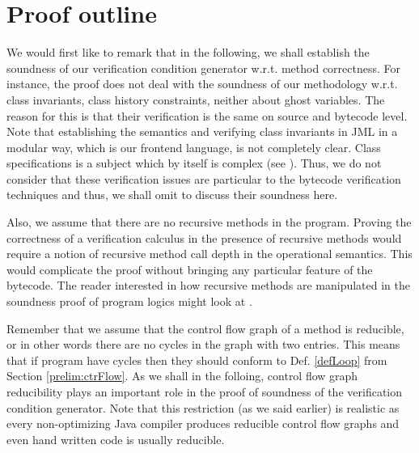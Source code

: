 \section{Proof outline} \label{proof:outline}
 We would first like to remark that in the following, we shall establish the soundness of our verification condition generator
 w.r.t. method correctness. For instance, the proof does not deal with the soundness of our
 methodology w.r.t. class invariants, class history constraints, neither about ghost variables. The reason for
 this is that their verification is the same on source and bytecode level. Note that establishing the semantics and 
 verifying class invariants in JML in a modular way, which is our frontend language, is not completely clear. Class
 specifications is a subject which  by itself is complex (see ).
 Thus,  we do not consider that these verification issues are particular to the bytecode verification  techniques
 and thus, we shall omit to discuss their soundness here. 

Also, we assume that there are no recursive methods in the program. 
Proving the correctness of a verification calculus in the presence 
of recursive methods would require a notion of recursive method call depth in the operational
semantics. This would complicate the proof without bringing any particular feature of the bytecode.
The reader interested in how recursive methods are manipulated in the soundness proof
of program logics might look at \cite{Nipkow-MOD2001}.  

Remember that we assume that the control flow graph of a method is reducible, or in other words there 
are no cycles in the graph with two entries. This means that if program have cycles then they should 
conform to Def. \ref{defLoop} from Section \ref{prelim:ctrFlow}.
As we shall in the folloing, control flow graph reducibility plays an important role in
 the proof of soundness of the verification condition generator. 
Note that this restriction (as we said earlier) is realistic as every non-optimizing Java compiler produces
reducible control flow graphs and even hand written code is usually reducible.


